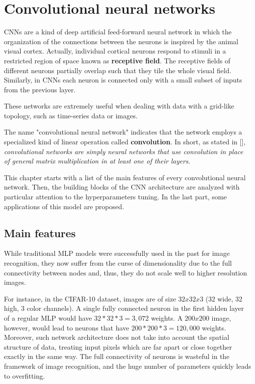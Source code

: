 \chapter{Convolutional neural networks}\label{ch:conv_nets}

\acp{CNN} are a kind of deep artificial feed-forward neural network in which the organization of the connections between the neurons is inspired by the animal visual cortex. Actually, individual cortical neurons respond to stimuli in a restricted region of space known as \textbf{receptive field}. The receptive fields of different neurons partially overlap such that they tile the whole visual field. Similarly, in \acp{CNN} each neuron is connected only with a small subset of inputs from the previous layer.

These networks are extremely useful when dealing with data with a grid-like topology, such as time-series data or images.

The name "convolutional neural network" indicates that the network employs a specialized kind of linear operation called \textbf{convolution}. In short, as stated in [\cite{Goodfellow-et-al-2016}], \emph{convolutional networks are simply neural networks that use convolution in place of general matrix multiplication in at least one of their layers}.

This chapter starts with a list of the main features of every convolutional neural network. Then, the building blocks of the \ac{CNN} architecture are analyzed with particular attention to the hyperparameters tuning. In the last part, some applications of this model are proposed.

\section{Main features}

While traditional \acf{MLP} models were successfully used in the past for image recognition, they now suffer from the curse of dimensionality due to the full connectivity between nodes and, thus, they do not scale well to higher resolution images.

For instance, in the CIFAR-10 dataset, images are of size $32x32x3$ (32 wide, 32 high, 3 color channels). A single fully connected neuron in the first hidden layer of a regular \ac{MLP} would have $32*32*3 = 3,072$ weights. A $200x200$ image, however, would lead to neurons that have $200*200*3 = 120,000$ weights.
Moreover, such network architecture does not take into account the spatial structure of data, treating input pixels which are far apart or close together exactly in the same way. The full connectivity of neurons is wasteful in the framework of image recognition, and the huge number of parameters quickly leads to overfitting.

